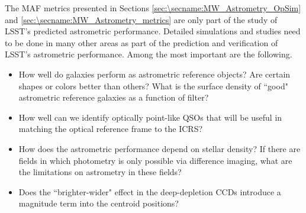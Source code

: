 The MAF metrics presented in Sections \ref{sec:\secname:MW_Astrometry_OpSim} and \ref{sec:\secname:MW_Astrometry_metrics} are only part of the
study of LSST's predicted astrometric performance.  Detailed simulations
and studies need to be done in many other areas as part of the
prediction and verification of LSST's astrometric performance.  Among
the most important are the following.
\begin{itemize}
\item How well do galaxies perform as astrometric reference objects? Are certain shapes or colors better than others? What is the 
surface density of ``good" astrometric reference galaxies as a function of filter? 
\item How well can we identify optically point-like QSOs that will be useful in matching the optical reference frame to the ICRS?
\item How does the astrometric performance depend on stellar density? If there are fields in which photometry is only possible via difference imaging, what are the limitations
on astrometry in these fields?
\item Does the ``brighter-wider" effect in the deep-depletion CCDs introduce a magnitude term into the centroid positions?
\end{itemize}

\navigationbar

